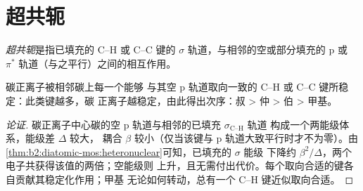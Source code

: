 \section{超共轭}

\begin{definition}[超共轭]\label{def:b2:fragment-orbitals:hyperconjugation}
\emph{超共轭}是指已填充的
C--H 或 C--C 键的 $\sigma$ 轨道，与相邻的空或部分填充的 p
或 $\pi^*$ 轨道（与之平行）之间的相互作用。
\end{definition}

\begin{proposition}[烷基使碳正离子稳定]\label{prop:b2:fragment-orbitals:hyperconjugation}
碳正离子被相邻碳上每一个能够
与其空 p 轨道取向一致的 C--H 或 C--C 键所稳定：此类键越多，碳
正离子越稳定，由此得出次序：叔 > 仲 > 伯 > 甲基。
\end{proposition}

\begin{proof}[论证]
碳正离子中心碳的空 p 轨道与相邻的已填充 $\sigma_{\text{C--H}}$ 轨道
构成一个两能级体系，能级差 $\Delta$ 较大，
耦合 $\beta$ 较小（仅当该键与 p 轨道大致平行时才不为零）。由
\cref{thm:b2:diatomic-mos:heteronuclear}可知，已填充的 $\sigma$ 能级
下降约 $\beta^2/\Delta$，两个电子共获得该值的两倍；空能级则
上升，且无需付出代价。每个取向合适的键各自贡献其稳定化作用；甲基
无论如何转动，总有一个 C--H 键近似取向合适。
\end{proof}

